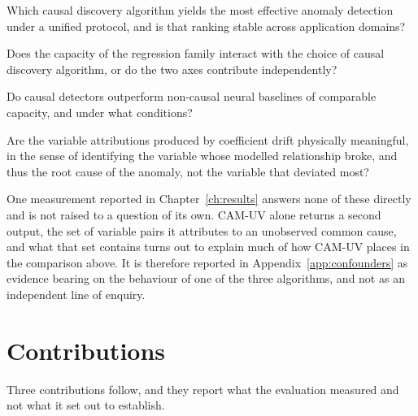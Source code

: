 \begin{description}[leftmargin=1.6cm,style=nextline,font=\bfseries]
  \item[RQ1] Which causal discovery algorithm yields the most effective anomaly detection under a unified protocol, and is that ranking stable across application domains?
  \item[RQ2] Does the capacity of the regression family interact with the choice of causal discovery algorithm, or do the two axes contribute independently?
  \item[RQ3] Do causal detectors outperform non-causal neural baselines of comparable capacity, and under what conditions?
  \item[RQ4] Are the variable attributions produced by coefficient drift physically meaningful, in the sense of identifying the variable whose modelled relationship broke, and thus the root cause of the anomaly, not the variable that deviated most?
\end{description}

One measurement reported in Chapter~\ref{ch:results} answers none of these directly and is not raised to a question of its own. CAM-UV alone returns a second output, the set of variable pairs it attributes to an unobserved common cause, and what that set contains turns out to explain much of how CAM-UV places in the comparison above. It is therefore reported in Appendix~\ref{app:confounders} as evidence bearing on the behaviour of one of the three algorithms, and not as an independent line of enquiry.

\section{Contributions}
\label{sec:contributions}

Three contributions follow, and they report what the evaluation measured and not what it set out to establish.

